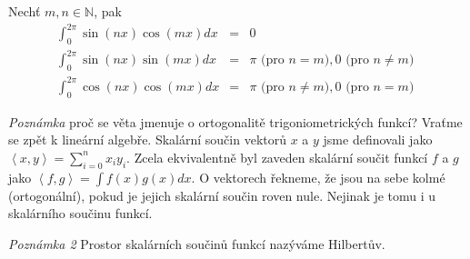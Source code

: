 \begin{vetal}
\label{o ortogonalitě trigoniometrických funkcí}
Nechť $m, n \in \mathbb{N}$, pak
\begin{eqnarray*}
\int_{0}^{2 \pi} \sin (nx) \cos (mx) dx & = & 0 \\
\int_{0}^{2 \pi} \sin (nx) \sin (mx) dx & = & \pi \textrm{ (pro $n=m$)}, 0 \textrm{ (pro $n \neq m$) } \\
\int_{0}^{2 \pi} \cos (nx) \cos (mx) dx & = & \pi \textrm{ (pro $n \neq m$)}, 0 \textrm{ (pro $n=m$)} 
\end{eqnarray*}
\end{vetal}

\emph{Poznámka} proč se věta jmenuje o ortogonalitě trigoniometrických funkcí? Vraťme se zpět k lineární algebře. Skalární součin vektorů $x$ a $y$ jsme definovali jako $\left\langle x,y \right\rangle = \sum_{i=0}^{n} x_i y_i$. Zcela ekvivalentně byl zaveden skalární součit funkcí $f$ a $g$ jako $\left\langle f, g \right\rangle = \int f(x) g(x) dx$. O vektorech řekneme, že jsou na sebe kolmé (ortogonální), pokud je jejich skalární součin roven nule. Nejinak je tomu i u skalárního součinu funkcí. 

\emph{Poznámka 2} Prostor skalárních součinů funkcí nazýváme Hilbertův.

